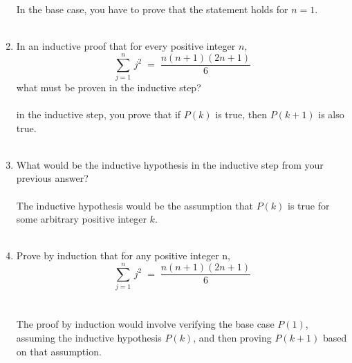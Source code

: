\documentclass{amsart}
\theoremstyle{definition}
\theoremstyle{Exercise}
\theoremstyle{remark}
\theoremstyle{rule}
\numberwithin{equation}{section}
\begin{document}
\begin{enumerate}[label=(\alph*)]
    In the base case, you have to prove that the statement holds for $n=1$.
    \\\\
    \item In an inductive proof that for every positive integer $n$,
   \[\displaystyle \sum_{j=1}^{n}\, j^2 \;=\;\frac{n(n+1)(2n+1)}{6}\]
   what must be proven in the inductive step?\\\\
    in the inductive step, you prove that if $P(k)$ is true, then $P(k+1)$ is also true.
   \\\\
   \item What would be the inductive hypothesis in the inductive step from your previous answer?\\\\
    The inductive hypothesis would be the assumption that $P(k)$ is true for some arbitrary positive integer $k$.
    \\\\
   \item Prove by induction that for any positive integer n,
   \[\displaystyle \sum_{j=1}^{n}\, j^2 \;=\;\frac{n(n+1)(2n+1)}{6}\] \\\\
    The proof by induction would involve verifying the base case $P(1)$, assuming the inductive hypothesis $P(k)$, and then proving $P(k+1)$ based on that assumption.
\end{enumerate}
\end{document}
